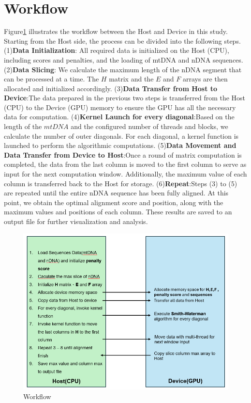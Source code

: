 \documentclass[PhD]{PHlab-thesis}
\begin{document}
\section{Workflow}
Figure\ref{fig:Workflow} illustrates the workflow between the Host and Device in this study. Starting from the Host side, the process can be divided into the following steps.
(1)\textbf{Data Initialization}: All required data is initialized on the Host (CPU), including scores and penalties, and the loading of mtDNA and nDNA sequences.
(2)\textbf{Data Slicing}: We calculate the maximum length of the nDNA segment that can be processed at a time. The $H$ matrix and the $E$ and $F$ arrays are then allocated and initialized accordingly.
(3)\textbf{Data Transfer from Host to Device}:The data prepared in the previous two steps is transferred from the Host (CPU) to the Device (GPU) memory to ensure the GPU has all the necessary data for computation.
(4)\textbf{Kernel Launch for every diagonal}:Based on the length of the $mtDNA$ and the configured number of threads and blocks, we calculate the number of outer diagonals. For each diagonal, a kernel function is launched to perform the algorithmic computations.
(5)\textbf{Data Movement and Data Transfer from Device to Host}:Once a round of matrix computation is completed, the data from the last column is moved to the first column to serve as input for the next computation window. Additionally, the maximum value of each column is transferred back to the Host for storage.
(6)\textbf{Repeat}:Steps (3) to (5) are repeated until the entire nDNA sequence has been fully aligned. At this point, we obtain the optimal alignment score and position, along with the maximum values and positions of each column. These results are saved to an output file for further visualization and analysis.
\begin{figure}[htbp]
    \centering
    \includegraphics[width=1\linewidth]{figures/workflow.png}
    \caption{Workflow}
    \label{fig:Workflow}
\end{figure}
\end{document}
